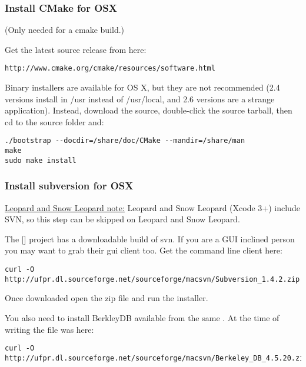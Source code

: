 \hypertarget{toc21}{}
\subsubsection{Install CMake for OSX}
(Only needed for a cmake build.)

Get the latest source release from here:

\begin{verbatim}
http://www.cmake.org/cmake/resources/software.html
\end{verbatim}

Binary installers are available for OS X, but they are not recommended
(2.4 versions install in /usr instead of /usr/local, and 2.6 versions are a
strange application). Instead, download the source, double-click the source tarball,
then cd to the source folder and:

\begin{verbatim}
./bootstrap --docdir=/share/doc/CMake --mandir=/share/man
make
sudo make install
\end{verbatim}

\hypertarget{toc22}{}
\subsubsection{Install subversion for OSX}
\underline{Leopard and Snow Leopard note:} Leopard and Snow Leopard (Xcode 3+)
include SVN, so this step can be skipped on Leopard and Snow Leopard.

The [] project has a downloadable
build of svn. If you are a GUI inclined person you may want to grab their gui
client too. Get the command line client here:

\begin{verbatim}
curl -O http://ufpr.dl.sourceforge.net/sourceforge/macsvn/Subversion_1.4.2.zip 
\end{verbatim}

Once downloaded open the zip file and run the installer.

You also need to install BerkleyDB available from the same
. At the time of writing the
file was here:

\begin{verbatim}
curl -O http://ufpr.dl.sourceforge.net/sourceforge/macsvn/Berkeley_DB_4.5.20.zip 
\end{verbatim}

